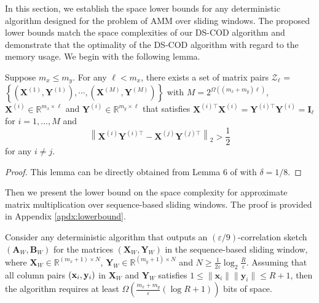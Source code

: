 In this section, we establish the space lower bounds for any deterministic algorithm designed for the problem of AMM over sliding windows. The proposed lower bounds match the space complexities of our DS-COD algorithm and demonstrate that the optimality of the DS-COD algorithm with regard to the memory usage. We begin with the following lemma.
\begin{lem} \label{lem:matrix_set}
    Suppose $m_x\leq m_y$. For any $\ell<m_x$, there exists a set of matrix pairs $\mathcal{Z}_{\ell}$ = $\left\{ ( \mathbf{X}^{(1)}, \mathbf{Y}^{(1)} ), \cdots , ( \mathbf{X}^{(M)}, \mathbf{Y}^{(M)} ) \right\}$ with $M=2^{\Omega((m_x+m_y)\ell)}$,  $\mathbf{X}^{(i)}\in\mathbb{R}^{m_x \times \ell}$ and $\mathbf{Y}^{(i)}\in\mathbb{R}^{m_y \times \ell}$ that satisfies $\mathbf{X}^{(i)\top} \mathbf{X}^{(i)} = \mathbf{Y}^{(i)\top} \mathbf{Y}^{(i)} = \mathbf{I}_{\ell}$ for $i=1, \ldots, M$ and 
    \[
    \left\|\mathbf{X}^{(i)} \mathbf{Y}^{(i)\top} - \mathbf{X}^{(j)} \mathbf{Y}^{(j)\top}\right\|_2 > \frac{1}{2}
    \]
    for any $i \neq j$.
\end{lem}
\begin{proof}
This lemma can be directly obtained from Lemma 6 of \cite{luo2021revisiting} with $\delta=1/8$.
\end{proof}

Then we present the lower bound on the space complexity for approximate matrix multiplication over sequence-based sliding windows. The proof is provided in Appendix \ref{apdx:lowerbound}.
\begin{thm}\label{thm:lowerbound}
    Consider any deterministic algorithm that outputs an $(\varepsilon/9)$-correlation sketch  $(\mathbf{A}_W,\mathbf{B}_W)$ for the matrices $(\mathbf{X}_W,\mathbf{Y}_W)$ in the sequence-based sliding window, 
    where $\mathbf{X}_W \in \mathbb{R}^{(m_x + 1) \times N}$, $\mathbf{Y}_W \in \mathbb{R}^{(m_y + 1) \times N}$ and $N \geq \frac{1}{2\varepsilon} \log_2{\frac{R}{\varepsilon}}$. Assuming that all column pairs $({\bf{x}}_i,{\bf{y}}_i)$ in $\mathbf{X}_W$ and $\mathbf{Y}_W$ satisfies $1 \leq \|\mathbf{x}_i\| \|\mathbf{y}_i\| \leq R + 1$, then the algorithm requires at least $\Omega\left(\frac{m_x + m_y}{\varepsilon} (\log{R}+1)\right)$ bits of space.
\end{thm}

